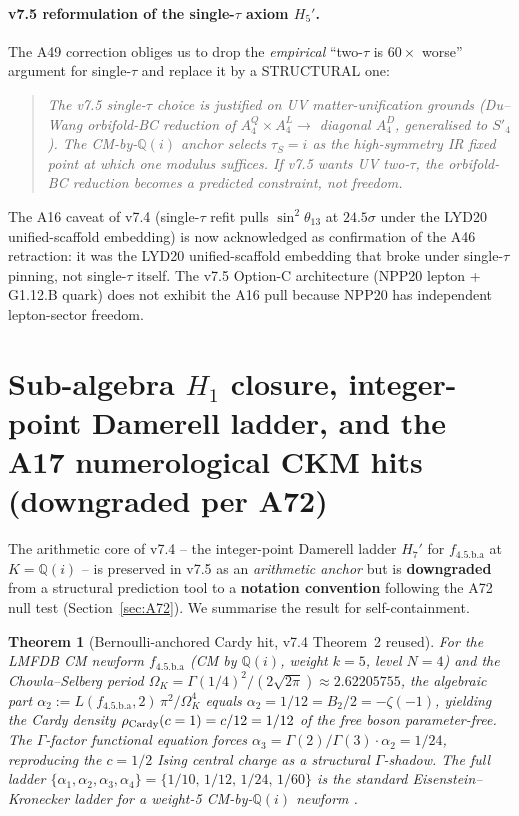 \documentclass[a4paper,11pt]{article}
\newcommand{\Spf}{S'_4}
\newcommand{\OmK}{\Omega_K}
\newcommand{\fLM}{f_{\text{4.5.b.a}}}
\newcommand{\Qi}{\mathbb{Q}(i)}
\newtheorem{theorem}{Theorem}
\theoremstyle{definition}
\theoremstyle{remark}
\begin{document}
\paragraph{v7.5 reformulation of the single-$\tau$ axiom
$H_5'$.}  The A49 correction obliges us to drop the
\emph{empirical} ``two-$\tau$ is $60\times$ worse'' argument
for single-$\tau$ and replace it by a STRUCTURAL one:
\begin{quote}\itshape
The v7.5 single-$\tau$ choice is justified on UV
matter-unification grounds (Du--Wang orbifold-BC reduction of
$A_4^{Q}\times A_4^{L}\to$ diagonal $A_4^{D}$, generalised to
$\Spf$).  The CM-by-$\Qi$ anchor selects $\tau_S=i$ as the
high-symmetry IR fixed point at which one modulus suffices.  If
v7.5 wants UV two-$\tau$, the orbifold-BC reduction becomes a
predicted constraint, not freedom.
\end{quote}
The A16 caveat of v7.4 (single-$\tau$ refit pulls
$\sin^2\theta_{13}$ at $24.5\sigma$ under the LYD20
unified-scaffold embedding) is now acknowledged as confirmation
of the A46 retraction: it was the LYD20 unified-scaffold
embedding that broke under single-$\tau$ pinning, not
single-$\tau$ itself.  The v7.5 Option-C architecture (NPP20
lepton + G1.12.B quark) does not exhibit the A16 pull because
NPP20 has independent lepton-sector freedom.

\section{Sub-algebra $H_1$ closure, integer-point Damerell ladder,
         and the A17 numerological CKM hits (downgraded per A72)}
\label{sec:H1ladder}

The arithmetic core of v7.4 -- the integer-point Damerell ladder
$H_7'$ for $\fLM$ at $K=\Qi$ -- is preserved in v7.5 as an
\emph{arithmetic anchor} but is \textbf{downgraded} from a
structural prediction tool to a \textbf{notation convention}
following the A72 null test (Section~\ref{sec:A72}).
We summarise the result for self-containment.

\begin{theorem}[Bernoulli-anchored Cardy hit, v7.4 Theorem~2 reused]
\label{thm:hit-v75}
For the LMFDB CM newform $\fLM$ (CM by $\Qi$, weight $k=5$,
level $N=4$) and the Chowla--Selberg period
$\OmK=\Gamma(1/4)^{2}/(2\sqrt{2\pi})\approx 2.62205755$, the
algebraic part $\alpha_2 := L(\fLM,2)\,\pi^{2}/\OmK^{4}$ equals
$\alpha_2 = 1/12 = B_2/2 = -\zeta(-1)$, yielding the Cardy
density $\rho_{\rm Cardy}(c=1)=c/12=1/12$ of the free boson
parameter-free.  The $\Gamma$-factor functional equation forces
$\alpha_3 = \Gamma(2)/\Gamma(3)\cdot\alpha_2 = 1/24$,
reproducing the $c=1/2$ Ising central charge as a structural
$\Gamma$-shadow.  The full ladder
$\{\alpha_1,\alpha_2,\alpha_3,\alpha_4\}=\{1/10,\,1/12,\,1/24,
\,1/60\}$ is the standard Eisenstein--Kronecker ladder for a
weight-5 CM-by-$\Qi$ newform
\cite{Hurwitz1899,ChowSel49,Damerell71,Shimura76,HS86,Visser21}.
\end{theorem}
\end{document}
